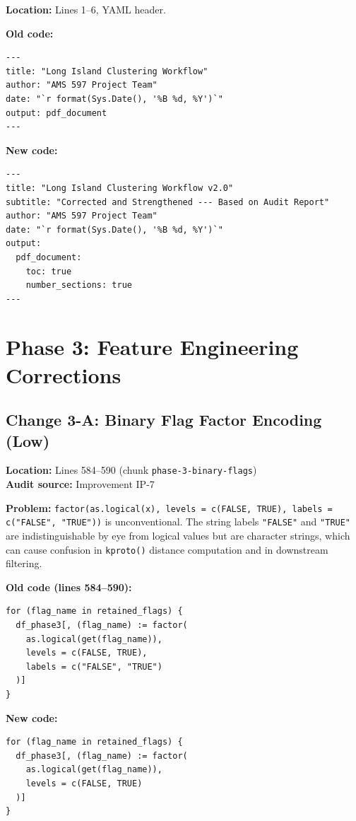 \documentclass[11pt]{article}
\newcommand{\rcode}[1]{\texttt{#1}}
\begin{document}
\textbf{Location:} Lines 1--6, YAML header.

\textbf{Old code:}
\begin{lstlisting}
---
title: "Long Island Clustering Workflow"
author: "AMS 597 Project Team"
date: "`r format(Sys.Date(), '%B %d, %Y')`"
output: pdf_document
---
\end{lstlisting}

\textbf{New code:}
\begin{lstlisting}
---
title: "Long Island Clustering Workflow v2.0"
subtitle: "Corrected and Strengthened --- Based on Audit Report"
author: "AMS 597 Project Team"
date: "`r format(Sys.Date(), '%B %d, %Y')`"
output:
  pdf_document:
    toc: true
    number_sections: true
---
\end{lstlisting}

\section{Phase 3: Feature Engineering Corrections}

\subsection{Change 3-A: Binary Flag Factor Encoding (Low)}

\textbf{Location:} Lines 584--590 (chunk \rcode{phase-3-binary-flags})\\
\textbf{Audit source:} Improvement IP-7

\textbf{Problem:} \rcode{factor(as.logical(x), levels = c(FALSE, TRUE), labels = c("FALSE", "TRUE"))}
is unconventional. The string labels \rcode{"FALSE"} and \rcode{"TRUE"} are
indistinguishable by eye from logical values but are character strings,
which can cause confusion in \rcode{kproto()} distance computation and in
downstream filtering.

\textbf{Old code (lines 584--590):}
\begin{lstlisting}
for (flag_name in retained_flags) {
  df_phase3[, (flag_name) := factor(
    as.logical(get(flag_name)),
    levels = c(FALSE, TRUE),
    labels = c("FALSE", "TRUE")
  )]
}
\end{lstlisting}

\textbf{New code:}
\begin{lstlisting}
for (flag_name in retained_flags) {
  df_phase3[, (flag_name) := factor(
    as.logical(get(flag_name)),
    levels = c(FALSE, TRUE)
  )]
}
\end{lstlisting}
\end{document}
